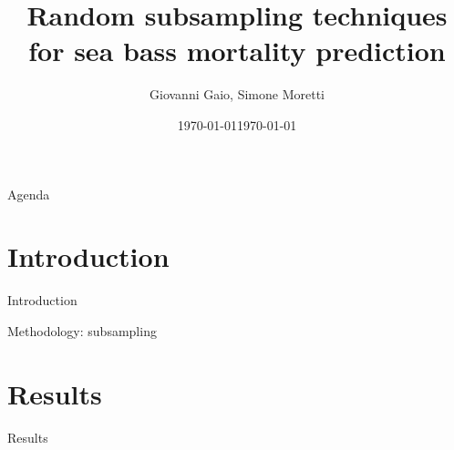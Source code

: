 \documentclass[aspectratio=169]{beamer}
\title{Random subsampling techniques for sea bass mortality prediction}
\author{Giovanni Gaio, Simone Moretti}
\date{\today}
\subtitle{}
\date{\today}
\begin{document}
\frame{\titlepage}

\begin{frame}{Agenda}
    \tableofcontents
\end{frame}

\section{Introduction}
\begin{frame}{Introduction}
\end{frame}

\begin{frame}{Methodology: subsampling}
\end{frame}

\section{Results}
\begin{frame}{Results}
\end{frame}
\end{document}
